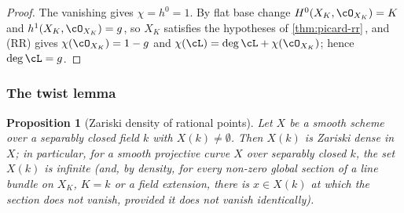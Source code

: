 \documentclass[11pt]{article}
\theoremstyle{plain}
\newtheorem{proposition}[theorem]{Proposition}
\theoremstyle{definition}
\newcommand{\Cref}[1]{\hyperref[#1]{\ref{#1}}\,\hyperref[#1]{\nameref*{#1}}}
\begin{document}
\begin{proof}
The vanishing gives $\chi=h^0=1$.  By flat base change
$H^0(X_K,\cO_{X_K})=K$ and $h^1(X_K,\cO_{X_K})=g$, so $X_K$ satisfies
the hypotheses of \Cref{thm:picard-rr}, and (RR) gives
$\chi(\cO_{X_K})=1-g$ and $\chi(\cL)=\deg\cL+\chi(\cO_{X_K})$;
hence $\deg\cL=g$.
\end{proof}

\subsubsection{The twist lemma}

\begin{proposition}[Zariski density of rational points]
\label{prop:picard-dense-points}
Let $X$ be a smooth scheme over a separably closed field $k$ with
$X(k)\neq\emptyset$.  Then $X(k)$ is Zariski dense in $X$; in
particular, for a smooth projective curve $X$ over separably closed
$k$, the set $X(k)$ is infinite (and, by density, for every
non-zero global section of a line bundle on $X_K$, $K=k$ or a
field extension, there is $x\in X(k)$ at which the section does not
vanish, provided it does not vanish identically).
\end{proposition}
\end{document}
